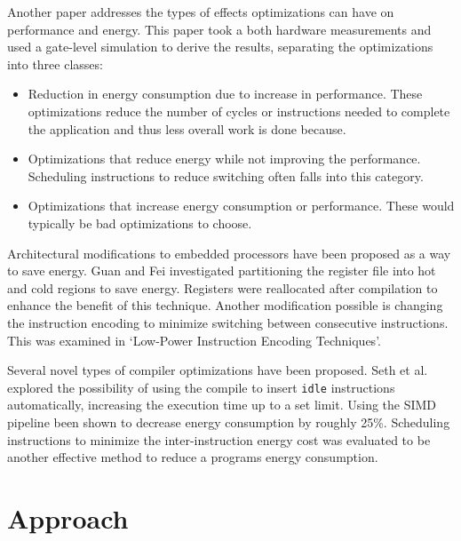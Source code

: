 \documentclass[twocolumn]{article}
\newcommand{\nsection}[1]{\section{\bfseries #1}}
\begin{document}
Another paper addresses the types of effects optimizations can have on performance and energy\cite{WhatCanAPoorCompilerDo}. This paper took a both hardware measurements and used a gate-level simulation to derive the results,  separating the optimizations into three classes:
\begin{itemize}
	\setlength{\itemsep}{0em}
	\vspace{-1mm}
	\item Reduction in energy consumption due to increase in performance. These optimizations reduce the number of cycles or instructions needed to complete the application and thus less overall work is done because.
	\item Optimizations that reduce energy while not improving the performance. Scheduling instructions to reduce switching often falls into this category.
	\item Optimizations that increase energy consumption or performance. These would typically be bad optimizations to choose.
\end{itemize}


Architectural modifications to embedded processors have been proposed as a way to save energy. Guan and Fei investigated partitioning the register file\cite{RegisterFilePartitioning} into hot and cold regions to save energy. Registers were reallocated after compilation to enhance the benefit of this technique. Another modification possible is changing the instruction encoding to minimize switching between consecutive instructions. This was examined in `Low-Power Instruction Encoding Techniques'\cite{LowPowerInstructionEncodings}.

Several novel types of compiler optimizations have been proposed. Seth et al.\cite{Seth2001} explored the possibility of using the compile to insert \texttt{idle} instructions automatically, increasing the execution time up to a set limit. Using the SIMD pipeline been shown to decrease energy consumption\cite{Ibrahim2009} by roughly 25\%. Scheduling instructions to minimize the inter-instruction energy cost was evaluated to be another effective method to reduce a programs energy consumption\cite{Parikh}.


\nsection{Approach}
\end{document}
